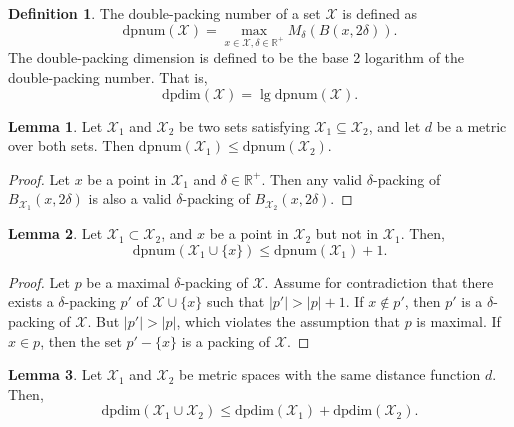 \documentclass{article}
\theoremstyle{definition}
\newtheorem{defn}{Definition}
\newtheorem{lemma}{Lemma}
\newcommand{\set}{\mathcal}
\newcommand{\distf}{d}
\newcommand{\dpdim}{\text{dpdim}}
\newcommand{\dpnum}{\text{dpnum}}
\begin{document}
\begin{defn}
The double-packing number of a set $\set X$ is defined as
\begin{equation}
\dpnum(\set X) = \max_{x\in\set X,\delta\in\mathbb R^+} M_\delta( B(x,2\delta))
.
\end{equation}
The double-packing dimension is defined to be the base 2 logarithm of the double-packing number.
That is,
\begin{equation}
\dpdim(\set X) = \lg \dpnum(\set X)
.
\end{equation}
\end{defn}

\begin{lemma}
Let $\set X_1$ and $\set X_2$ be two sets satisfying $\set X_1 \subseteq \set X_2$,
and let $\distf$ be a metric over both sets.
Then $\dpnum(\set X_1) \le \dpnum(\set X_2)$.
\end{lemma}
\begin{proof}
Let $x$ be a point in $\set X_1$ and $\delta\in\mathbb R^+$.
Then any valid $\delta$-packing of $B_{\set X_1}(x,2\delta)$ is also a valid $\delta$-packing of $B_{\set X_2}(x,2\delta)$.
\end{proof}

\begin{lemma}
Let $\set X_1 \subset \set X_2$,
and $x$ be a point in $\set X_2$ but not in $\set X_1$.
Then,
\begin{equation}
\dpnum(\set X_1 \cup\{x\}) \le \dpnum (\set X_1) + 1
.
\end{equation}
\end{lemma}
\begin{proof}
Let $p$ be a maximal $\delta$-packing of $\set X$.
Assume for contradiction that there exists a $\delta$-packing $p'$ of $\set X\cup\{x\}$ such that $|p'| > |p| + 1$.
If $x\not\in p'$, then $p'$ is a $\delta$-packing of $\set X$.
But $|p'| > |p|$, which violates the assumption that $p$ is maximal.
If $x\in p$, then the set $p'-\{x\}$ is a packing of $\set X$.
\end{proof}

\begin{lemma}
Let $\set X_1$ and $\set X_2$ be metric spaces with the same distance function $\distf$.
Then,
\begin{equation}
\dpdim(\set X_1 \cup \set X_2) \le \dpdim(\set X_1) + \dpdim(\set X_2)
.
\end{equation}
\end{lemma}
\end{document}
